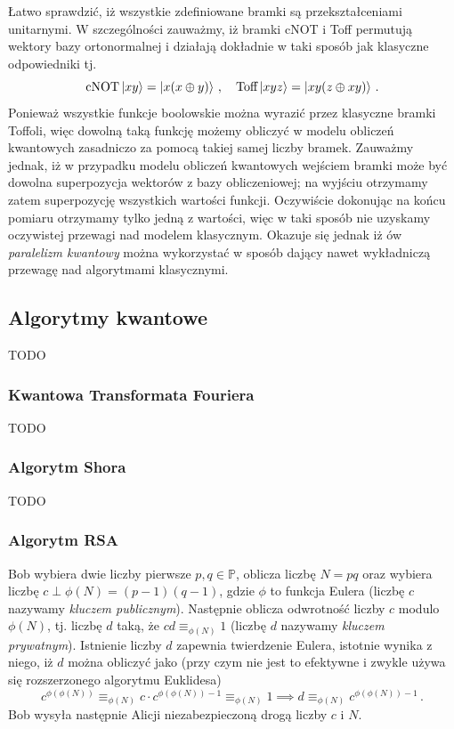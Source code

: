 \documentclass{myclass}
\begin{document}
Łatwo sprawdzić, iż wszystkie zdefiniowane bramki są przekształceniami unitarnymi. W szczególności
zauważmy, iż bramki cNOT i Toff permutują wektory bazy ortonormalnej i działają dokładnie w taki
sposób jak klasyczne odpowiedniki tj.
\begin{equation*}
    \text{cNOT}\ket{xy} = \ket{x(x\oplus y)}\,,\quad \text{Toff}\ket{xyz} = \ket{xy(z\oplus xy)}\,.
\end{equation*}
Ponieważ wszystkie funkcje boolowskie można wyrazić przez klasyczne bramki Toffoli, więc dowolną
taką funkcję możemy obliczyć w modelu obliczeń kwantowych zasadniczo za pomocą takiej samej liczby
bramek. Zauważmy jednak, iż w przypadku modelu obliczeń kwantowych wejściem bramki może być dowolna
superpozycja wektorów z bazy obliczeniowej; na wyjściu otrzymamy zatem superpozycję wszystkich
wartości funkcji. Oczywiście dokonując na końcu pomiaru otrzymamy tylko jedną z wartości, więc w
taki sposób nie uzyskamy oczywistej przewagi nad modelem klasycznym. Okazuje się jednak iż ów
\textit{paralelizm kwantowy} można wykorzystać w sposób dający nawet wykładniczą przewagę nad
algorytmami klasycznymi.

\subsection{Algorytmy kwantowe}

TODO

\subsubsection{Kwantowa Transformata Fouriera}

TODO

\subsubsection{Algorytm Shora}

TODO

\subsubsection*{Algorytm RSA}

Bob wybiera dwie liczby pierwsze \(p,q\in\mathbb{P}\), oblicza liczbę \(N = pq\) oraz wybiera liczbę
\(c \perp \phi(N) = (p-1)(q-1)\), gdzie \(\phi\) to funkcja Eulera (liczbę \(c\) nazywamy
\textit{kluczem publicznym}). Następnie oblicza odwrotność liczby \(c\) modulo \(\phi(N)\), tj.
liczbę \(d\) taką, że \(cd \equiv_{\phi(N)} 1\) (liczbę \(d\) nazywamy \textit{kluczem prywatnym}).
Istnienie liczby \(d\) zapewnia twierdzenie Eulera, istotnie wynika z niego, iż \(d\) można obliczyć
jako (przy czym nie jest to efektywne i zwykle używa się rozszerzonego algorytmu Euklidesa)
\begin{equation*}
    c^{\phi(\phi(N))} \equiv_{\phi(N)} c\cdot c^{\phi(\phi(N))-1} \equiv_{\phi(N)} 1  \implies d \equiv_{\phi(N)} c^{\phi(\phi(N))-1}\,.
\end{equation*}
Bob wysyła następnie Alicji niezabezpieczoną drogą liczby \(c\) i \(N\). 
\end{document}
